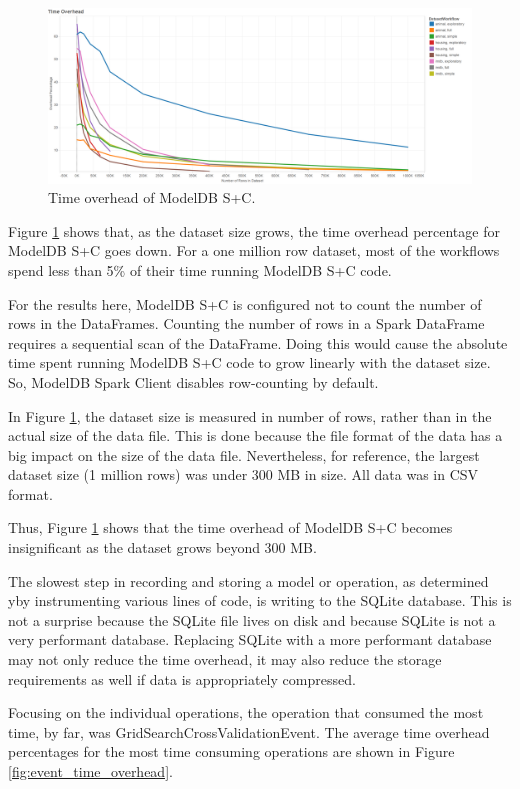 \begin{figure}
  \centering
  \includegraphics[width=6.0in]{time_overhead}
  \caption{
    Time overhead of ModelDB S+C.
  }
  \label{fig:time_overhead}
\end{figure}

Figure \ref{fig:time_overhead} shows that, as the dataset size grows, the time overhead
percentage for ModelDB S+C goes down. For a one million row dataset,
most of the workflows spend less than 5\% of their time running ModelDB S+C code.

For the results here, ModelDB S+C is configured not to count the number of rows in the DataFrames.
Counting the number of rows in a Spark DataFrame requires a sequential scan of the DataFrame. Doing this
would cause the absolute time spent running ModelDB S+C code to grow linearly with the dataset size. So, ModelDB Spark
Client disables row-counting by default.

In Figure \ref{fig:time_overhead}, the dataset size is measured in number of rows, rather than in
the actual size of the data file. This is done because the file format of the data has a big impact on
the size of the data file. Nevertheless, for reference, the largest dataset size (1 million rows) was under 300 MB
in size. All data was in CSV format.

Thus, Figure \ref{fig:time_overhead} shows that the time overhead of ModelDB S+C becomes insignificant 
as the dataset grows beyond 300 MB. 

The slowest step in recording and storing a model or operation, as determined yby 
instrumenting various lines of code, is writing to the SQLite database. This is not a surprise
because the SQLite file lives on disk and because SQLite is not a very performant database.
Replacing SQLite with a more performant database may not only reduce the time overhead, it may
also reduce the storage requirements as well if data is appropriately compressed.

Focusing on the individual operations, the operation that consumed the most time, by far, was
GridSearchCrossValidationEvent. The average time overhead percentages for the most time
consuming operations are shown in Figure \ref{fig:event_time_overhead}.


